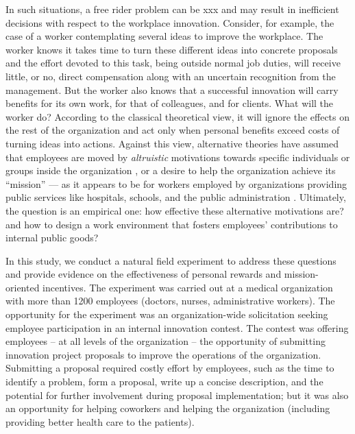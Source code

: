 \documentclass[11pt]{article}
\begin{document}
In such situations, a free rider problem can be xxx and may result in
inefficient decisions with respect to the workplace innovation.
Consider, for example, the case of a worker contemplating several ideas
to improve the workplace. The worker knows it takes time to turn these
different ideas into concrete proposals and the effort devoted to this
task, being outside normal job duties, will receive little, or no,
direct compensation along with an uncertain recognition from the
management. But the worker also knows that a successful innovation will
carry benefits for its own work, for that of colleagues, and for
clients. What will the worker do? According to the classical theoretical
view, it will ignore the effects on the rest of the organization and act
only when personal benefits exceed costs of turning ideas into actions.
Against this view, alternative theories have assumed that employees are
moved by \emph{altruistic} motivations towards specific individuals or
groups inside the organization \citep{rotemberg2006altruism}, or a
desire to help the organization achieve its ``mission''
\citep{akerlof2005identity, besley2005competition} --- as it appears to
be for workers employed by organizations providing public services like
hospitals, schools, and the public administration
\citep{delfgaauw2005dedicated, delfgaauw2008incentives, prendergast2007motivation}.
Ultimately, the question is an empirical one: how effective these
alternative motivations are? and how to design a work environment that
fosters employees' contributions to internal public goods?

In this study, we conduct a natural field experiment to address these
questions and provide evidence on the effectiveness of personal rewards
and mission-oriented incentives. The experiment was carried out at a
medical organization with more than 1200 employees (doctors, nurses,
administrative workers). The opportunity for the experiment was an
organization-wide solicitation seeking employee participation in an
internal innovation contest. The contest was offering employees -- at
all levels of the organization -- the opportunity of submitting
innovation project proposals to improve the operations of the
organization. Submitting a proposal required costly effort by employees,
such as the time to identify a problem, form a proposal, write up a
concise description, and the potential for further involvement during
proposal implementation; but it was also an opportunity for helping
coworkers and helping the organization (including providing better
health care to the patients).
\end{document}

